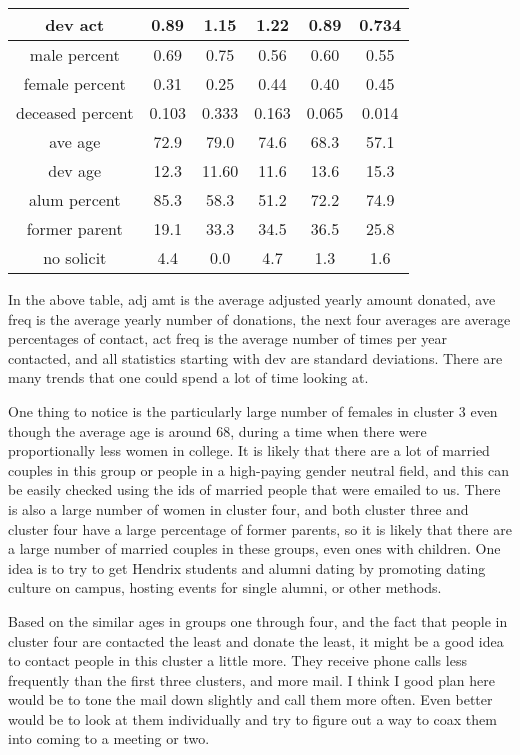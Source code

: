 \documentclass[../main.tex]{subfiles}
\begin{document}
\begin{center}
\begin{tabular}{||c c c c c c||}
        dev act & 0.89 & 1.15 & 1.22 & 0.89 & 0.734 \\
        \hline
        male percent & 0.69 & 0.75 & 0.56 & 0.60 & 0.55 \\
        female percent & 0.31 & 0.25 & 0.44 & 0.40 & 0.45 \\
        \hline
        deceased percent & 0.103 & 0.333 & 0.163 & 0.065 & 0.014 \\
        \hline
        ave age & 72.9 & 79.0 & 74.6 & 68.3 & 57.1 \\
        dev age & 12.3 & 11.60 & 11.6 & 13.6 & 15.3 \\
        \hline
        alum percent & 85.3 & 58.3 & 51.2 & 72.2 & 74.9 \\
        former parent & 19.1 & 33.3 & 34.5 & 36.5 & 25.8 \\
        \hline
        no solicit & 4.4 & 0.0 & 4.7 & 1.3 & 1.6 \\
        \hline

    \end{tabular}
\end{center}
In the above table, adj amt is the average adjusted yearly amount donated,
ave freq is the average yearly number of donations, the next four averages
are average percentages of contact, act freq is the average number of times
per year contacted, and all statistics starting with dev are standard
deviations. There are many trends that one could spend a lot of time
looking at.

One thing to notice is the particularly large number of females in cluster 3
even though the average age is around 68, during a time when there were
proportionally less women in college. It is likely that there are a lot of
married couples in this group or people in a high-paying gender neutral
field, and this can be easily checked using the ids
of married people that were emailed to us. There is also a large number of
women in cluster four, and both cluster three and cluster four have a large
percentage of former parents, so it is likely that there are a large number
of married couples in these groups, even ones with children. One idea is to
try to get Hendrix students and alumni dating by promoting dating culture on
campus, hosting events for single alumni, or other methods.

Based on the similar ages in groups one through four, and the fact that
people in cluster four are contacted the least and donate the least, it
might be a good idea to contact people in this cluster a little more. They
receive phone calls less frequently than the first three clusters, and more
mail. I think I good plan here would be to tone the mail down slightly and
call them more often. Even better would be to look at them individually and
try to figure out a way to coax them into coming to a meeting or two. 
\end{document}
